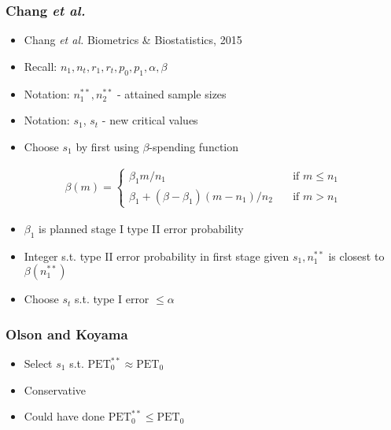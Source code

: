 \documentclass{beamer}\usepackage[]{graphicx}\usepackage[]{color}
\begin{document}
\begin{frame}
\frametitle{Chang \textit{et al.}}
    \begin{itemize}
        \item Chang \textit{et al.} Biometrics \& Biostatistics, 2015
        \item Recall: $n_1, n_t, r_1, r_t, p_0, p_1, \alpha, \beta$
        \item Notation: $n_1^{\ast\ast}, n_2^{\ast\ast}$ - attained sample sizes
        \item Notation: $s_1$, $s_t$ - new critical values
        \item Choose $s_1$ by first using $\beta$-spending function
    \end{itemize}
\begin{equation*}
\begin{aligned}
\beta(m) = \left\{
        \begin{array}{ll}
            \beta_1 m/n_1 & \quad \text{if } m\leq n_1 \\
            \beta_1 + (\beta - \beta_1)(m - n_1)/n_2 & \quad \text{if } m > n_1
        \end{array}
    \right.
\end{aligned}
\end{equation*}
  \begin{itemize}
      \item $\beta_1$ is planned stage I type II error probability
      \item Integer s.t. type II error probability in first stage given $s_1, n_1^{\ast\ast}$ is closest to $\beta(n_1^{\ast\ast})$
      \item Choose $s_t$ s.t. type I error $\leq \alpha$
  \end{itemize}
\end{frame}

\begin{frame}
\frametitle{Olson and Koyama}
    \begin{itemize}
        \item Select $s_1$ s.t. $\mbox{PET}_0^{\ast\ast} \approx \mbox{PET}_0$ 
        \item Conservative
        \item Could have done $\mbox{PET}_0^{\ast\ast} \leq \mbox{PET}_0$ 
    \end{itemize}
\end{frame}
\end{document}
